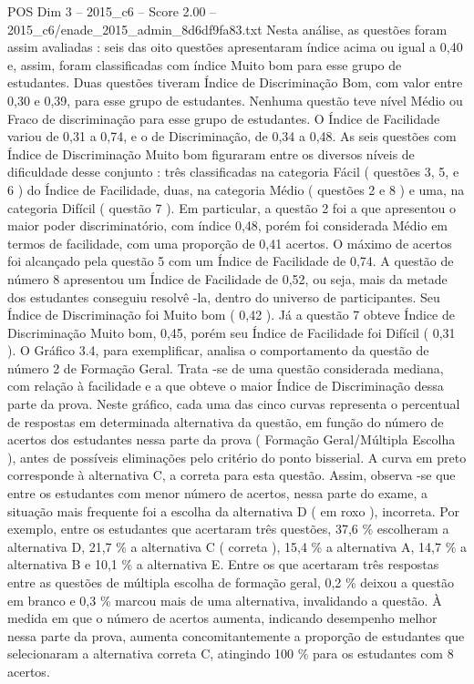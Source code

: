 \begin{textsample}{POS Dim 3 – 2015\_c6 – Score 2.00 – 2015\_c6/enade\_2015\_admin\_8d6df9fa83.txt}
Nesta análise, as questões foram assim avaliadas : seis das oito questões apresentaram índice acima ou igual a 0,40 e, assim, foram classificadas com índice Muito bom para esse grupo de estudantes.
Duas questões tiveram Índice de Discriminação Bom, com valor entre 0,30 e 0,39, para esse grupo de estudantes.
Nenhuma questão teve nível Médio ou Fraco de discriminação para esse grupo de estudantes.
O Índice de Facilidade variou de 0,31 a 0,74, e o de Discriminação, de 0,34 a 0,48.
As seis questões com Índice de Discriminação Muito bom figuraram entre os diversos níveis de dificuldade desse conjunto : três classificadas na categoria Fácil ( questões 3, 5, e 6 ) do Índice de Facilidade, duas, na categoria Médio ( questões 2 e 8 ) e uma, na categoria Difícil ( questão 7 ).
Em particular, a questão 2 foi a que apresentou o maior poder discriminatório, com índice 0,48, porém foi considerada Médio em termos de facilidade, com uma proporção de 0,41 acertos.
O máximo de acertos foi alcançado pela questão 5 com um Índice de Facilidade de 0,74.
A questão de número 8 apresentou um Índice de Facilidade de 0,52, ou seja, mais da metade dos estudantes conseguiu resolvê -la, dentro do universo de participantes.
Seu Índice de Discriminação foi Muito bom ( 0,42 ).
Já a questão 7 obteve Índice de Discriminação Muito bom, 0,45, porém seu Índice de Facilidade foi Difícil ( 0,31 ).
O Gráfico 3.4, para exemplificar, analisa o comportamento da questão de número 2 de Formação Geral.
Trata -se de uma questão considerada mediana, com relação à facilidade e a que obteve o maior Índice de Discriminação dessa parte da prova.
Neste gráfico, cada uma das cinco curvas representa o percentual de respostas em determinada alternativa da questão, em função do número de acertos dos estudantes nessa parte da prova ( Formação Geral/Múltipla Escolha ), antes de possíveis eliminações pelo critério do ponto bisserial.
A curva em preto corresponde à alternativa C, a correta para esta questão.
Assim, observa -se que entre os estudantes com menor número de acertos, nessa parte do exame, a situação mais frequente foi a escolha da alternativa D ( em roxo ), incorreta.
Por exemplo, entre os estudantes que acertaram três questões, 37,6 \% escolheram a alternativa D, 21,7 \% a alternativa C ( correta ), 15,4 \% a alternativa A, 14,7 \% a alternativa B e 10,1 \% a alternativa E.
Entre os que acertaram três respostas entre as questões de múltipla escolha de formação geral, 0,2 \% deixou a questão em branco e 0,3 \% marcou mais de uma alternativa, invalidando a questão.
À medida em que o número de acertos aumenta, indicando desempenho melhor nessa parte da prova, aumenta concomitantemente a proporção de estudantes que selecionaram a alternativa correta C, atingindo 100 \% para os estudantes com 8 acertos.

\end{textsample}
